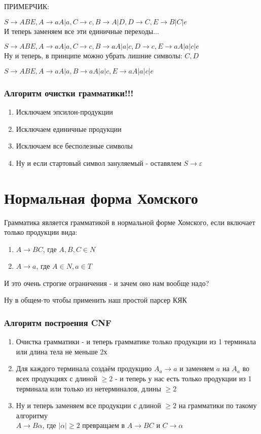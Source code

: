 \documentclass{article}
\begin{document}
ПРИМЕРЧИК:

$ S \to ABE, A \to aA | a, C \to c, B \to A | D, D \to C, E \to B | C | e $ \\

И теперь заменяем все эти единичные переходы...

$ S \to ABE, A \to aA | a, C \to c, B \to aA | a | c, D \to c, E \to aA | a|c |e $ \\

Ну и теперь, в принципе можно убрать лишние символы: $C, D$

$ S \to ABE, A \to aA | a, B \to aA | a | c, E \to aA | a|c |e $



\section{Алгоритм очистки грамматики!!!}
\begin{enumerate}
\item Исключаем эпсилон-продукции
\item Исключаем единичные продукции
\item Исключаем все бесполезные символы
\item Ну и если стартовый символ зануляемый - оставялем $ S \to \varepsilon $

\end{enumerate}
\part{Нормальная форма Хомского}
Грамматика является грамматикой в нормальной форме Хомского, если включает только продукции вида:
\begin{enumerate}
\item $ A \to BC $, где $ A, B, C \in N $
\item $ A \to a $, где $ A \in N, a \in T $
\end{enumerate}

И это очень строгие ограничения - и зачем оно нам вообще надо?

Ну в общем-то чтобы применить наш простой парсер КЯК

\section{Алгоритм построения CNF}
\begin{enumerate}
  \item Очистка грамматики -  и теперь  грамматике только продукции из 1 терминала или длина тела не меньше 2х
    \item Для каждого терминала создаём продукцию $ A_a \to a $ и заменяем $ a $ на $ A_a $ во всех продукциях с длиной $ \ge 2 $ - 
          и теперь у нас есть только продукции из 1 терминала или только из нетерминалов, длины $ \ge 2 $
     \item Ну и теперь заменяем все продукции с длиной $ \ge 2 $ на грамматики по такому алгоритму\\
      $ A \to B\alpha $, где $ |\alpha| \ge 2 $ превращаем в $ A \to BC$ и $C \to \alpha $
\end{enumerate}
\end{document}
